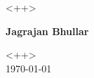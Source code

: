 \documentclass[12pt]{article}
\title{\textsc{\huge <++>}}
\begin{document}
\begin{titlepage}
    \begin{center}
        \vspace*{1cm}
        
        \Huge
        \textbf{\@title}
        
        \vspace{0.5cm}
        \LARGE
       	<++> 
        
        \vspace{1.5cm}
        
        \textbf{Jagrajan Bhullar}

	\vfill

	\Large
	<++>\\
	\today\\
        
    \end{center}
\end{titlepage}

\tableofcontents
\end{document}
